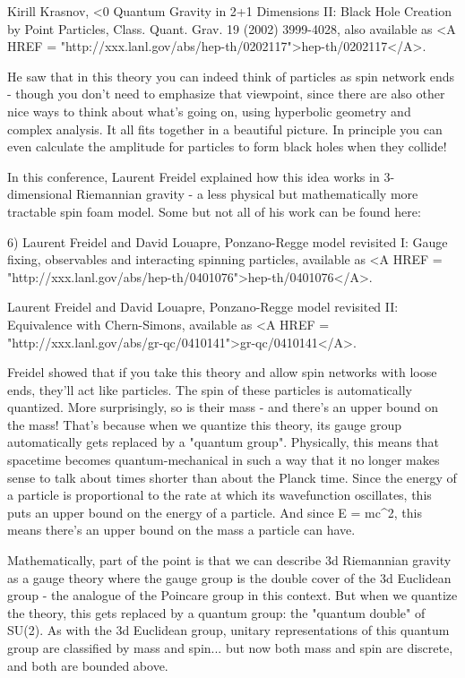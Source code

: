 Kirill Krasnov, \Lambda <0 Quantum Gravity in 2+1 Dimensions II: 
Black Hole Creation by Point Particles, Class. Quant. Grav. 19 (2002) 
3999-4028, also available as <A HREF = "http://xxx.lanl.gov/abs/hep-th/0202117">hep-th/0202117</A>.

He saw that in this theory you can indeed think of particles as spin 
network ends - though you don't need to emphasize that viewpoint, 
since there are also other nice ways to think about what's going on,
using hyperbolic geometry and complex analysis.  It all fits together 
in a beautiful picture.  In principle you can even calculate 
the amplitude for particles to form black holes when they collide!

In this conference, Laurent Freidel explained how this idea works in
3-dimensional Riemannian gravity - a less physical but mathematically 
more tractable spin foam model.  Some but not all of his work can
be found here:

6) Laurent Freidel and David Louapre, Ponzano-Regge model revisited I: 
Gauge fixing, observables and interacting spinning particles, available
as <A HREF = "http://xxx.lanl.gov/abs/hep-th/0401076">hep-th/0401076</A>.

Laurent Freidel and David Louapre, Ponzano-Regge model revisited II: 
Equivalence with Chern-Simons, available as <A HREF = "http://xxx.lanl.gov/abs/gr-qc/0410141">gr-qc/0410141</A>.

Freidel showed that if you take this theory and allow spin networks with
loose ends, they'll act like particles.  The spin of these particles is 
automatically quantized.  More surprisingly, so is their mass - and 
there's an upper bound on the mass!  That's because when we quantize 
this theory, its gauge group automatically gets replaced by a "quantum 
group".   Physically, this means that spacetime becomes quantum-mechanical 
in such a way that it no longer makes sense to talk about times shorter 
than about the Planck time.  Since the energy of a particle is proportional 
to the rate at which its wavefunction oscillates, this puts an upper 
bound on the energy of a particle.  And since E = mc^2, this means 
there's an upper bound on the mass a particle can have.  

Mathematically, part of the point is that we can describe 3d Riemannian 
gravity as a gauge theory where the gauge group is the double cover of
the 3d Euclidean group - the analogue of the Poincare group in this 
context.  But when we quantize the theory, this gets replaced by a 
quantum group: the "quantum double" of SU(2).  As with the 3d Euclidean 
group, unitary representations of this quantum group are classified by 
mass and spin... but now both mass and spin are discrete, and both are 
bounded above.


